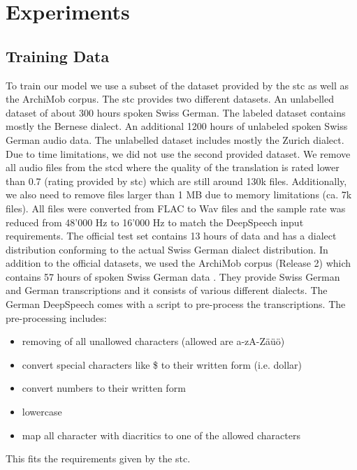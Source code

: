 \section{Experiments}

\subsection{Training Data}
To train our model we use a subset of the dataset provided by the \gls{stc} as well as the ArchiMob corpus. The \gls{stc} provides two different datasets. An unlabelled dataset of about 300 hours spoken Swiss German. The labeled dataset contains mostly the Bernese dialect. An additional 1200 hours of unlabeled spoken Swiss German audio data. The unlabelled dataset includes mostly the Zurich dialect. Due to time limitations, we did not use the second provided dataset. We remove all audio files from the \gls{stcd} where the quality of the translation is rated lower than 0.7 (rating provided by \gls{stc}) which are still around 130k files. Additionally, we also need to remove files larger than 1 MB due to memory limitations (ca. 7k files). All files were converted from FLAC to Wav files and the sample rate was reduced from 48'000 Hz to 16'000 Hz to match the DeepSpeech input requirements. The official test set contains 13 hours of data \cite{stc2019} and has a dialect distribution conforming to the actual Swiss German dialect distribution. In addition to the official datasets, we used the ArchiMob corpus (Release 2) which contains 57 hours of spoken Swiss German data \cite{archimob2016}. They provide Swiss German and German transcriptions and it consists of various different dialects.
The German DeepSpeech comes with a script to pre-process the transcriptions. The pre-processing includes:
\begin{itemize}
\item removing of all unallowed characters (allowed are a-zA-Zäüö)
\item convert special characters like \$ to their written form (i.e. dollar)
\item convert numbers to their written form
\item lowercase
\item map all character with diacritics to one of the allowed characters
\end{itemize}

This fits the requirements given by the \gls{stc}.

